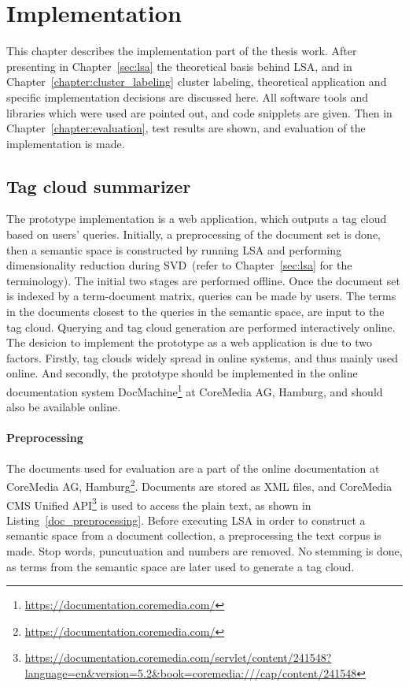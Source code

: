 \chapter{Implementation}
\label{sec:implementation}

This chapter describes the implementation part of the thesis work. After presenting in Chapter~\ref{sec:lsa} the theoretical basis behind \gls{LSA}, and in Chapter~\ref{chapter:cluster_labeling} cluster labeling, theoretical application and specific implementation decisions are discussed here. All software tools and libraries which were used are pointed out, and code snipplets are given. Then in Chapter~\ref{chapter:evaluation}, test results are shown, and evaluation of the implementation is made. \\


\section{Tag cloud summarizer}

The prototype implementation is a web application, which outputs a tag cloud based on users' queries. Initially, a preprocessing of the document set is done, then a semantic space is constructed by running \gls{LSA} and performing dimensionality reduction during \gls{SVD}~(refer to Chapter~\ref{sec:lsa} for the terminology). The initial two stages are performed offline. Once the document set is indexed by a term-document  matrix, queries can be made by users. The terms in the documents closest to the queries in the semantic space, are input to the tag cloud. Querying and tag cloud generation are performed interactively online. \\

The desicion to implement the prototype as a web application is due to two factors. Firstly, tag clouds widely spread in online systems, and thus mainly used online. And secondly, the prototype should be implemented in the online documentation system DocMachine\footnote{\url{https://documentation.coremedia.com/}} at CoreMedia AG, Hamburg, and should also be available online. \\

\subsubsection{Preprocessing}
The documents used for evaluation are a part of the online documentation at CoreMedia AG, Hamburg\footnote{\url{https://documentation.coremedia.com/}}. Documents are stored as XML files, and CoreMedia \gls{CMS} Unified API\footnote{\url{https://documentation.coremedia.com/servlet/content/241548?language=en&version=5.2&book=coremedia:///cap/content/241548}} is used to access the plain text, as shown in Listing~\ref{doc_preprocessing}. Before executing \gls{LSA} in order to construct a semantic space from a document collection, a preprocessing the text corpus is made. Stop words, puncutuation and numbers are removed. No stemming is done, as terms from the semantic space are later used to generate a tag cloud. 

